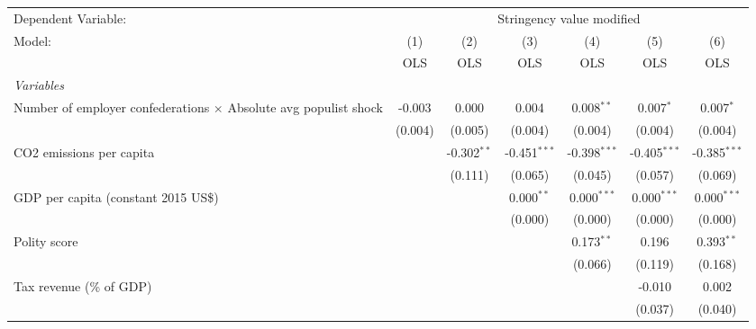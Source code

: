 
\begingroup
\centering
\begin{tabular}{lcccccc}
   \toprule
   Dependent Variable: & \multicolumn{6}{c}{Stringency value modified}\\
   Model:                                                                  & (1)     & (2)           & (3)            & (4)            & (5)            & (6)\\  
                                                                           &  OLS    & OLS           & OLS            & OLS            & OLS            & OLS\\  
   \midrule
   \emph{Variables}\\
   Number of employer confederations $\times$ Absolute avg populist shock  & -0.003  & 0.000         & 0.004          & 0.008$^{**}$   & 0.007$^{*}$    & 0.007$^{*}$\\   
                                                                           & (0.004) & (0.005)       & (0.004)        & (0.004)        & (0.004)        & (0.004)\\   
   CO2 emissions per capita                                                &         & -0.302$^{**}$ & -0.451$^{***}$ & -0.398$^{***}$ & -0.405$^{***}$ & -0.385$^{***}$\\   
                                                                           &         & (0.111)       & (0.065)        & (0.045)        & (0.057)        & (0.069)\\   
   GDP per capita (constant 2015 US\$)                                     &         &               & 0.000$^{**}$   & 0.000$^{***}$  & 0.000$^{***}$  & 0.000$^{***}$\\   
                                                                           &         &               & (0.000)        & (0.000)        & (0.000)        & (0.000)\\   
   Polity score                                                            &         &               &                & 0.173$^{**}$   & 0.196          & 0.393$^{**}$\\   
                                                                           &         &               &                & (0.066)        & (0.119)        & (0.168)\\   
   Tax revenue (\% of GDP)                                                 &         &               &                &                & -0.010         & 0.002\\   
                                                                           &         &               &                &                & (0.037)        & (0.040)\\   

\end{tabular}
